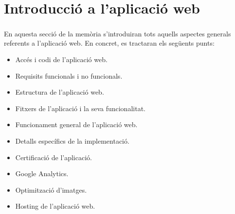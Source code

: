 \chapter{Introducció a l'aplicació web}

    \paragraph{}
    En aquesta secció de la memòria s’introduiran tots aquells aspectes generals re\-fe\-rents a l’aplicació web. En concret, es tractaran els següents punts:

    \begin{itemize}
        \item Accés i codi de l’aplicació web.
        \item Requisits funcionals i no funcionals.
        \item Estructura de l’aplicació web.
        \item Fitxers de l'aplicació i la seva funcionalitat.
        \item Funcionament general de l’aplicació web.
        \item Detalls específics de la implementació.
        \item Certificació de l’aplicació.
        \item Google Analytics.
        \item Optimització d’imatges.
        \item Hosting de l’aplicació web.
    \end{itemize}

    
    
    
    
    
    
    
    
    
    
